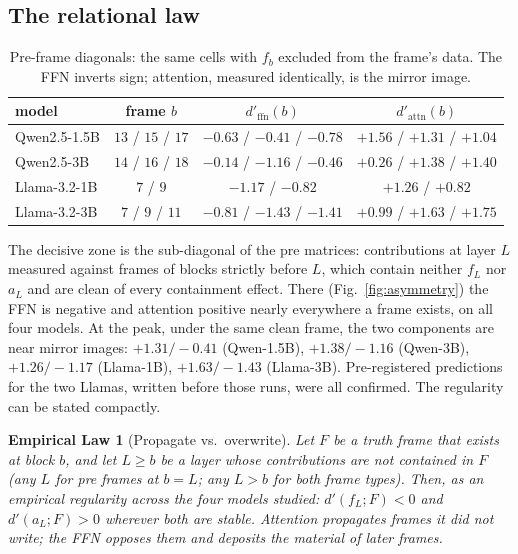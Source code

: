 \documentclass[11pt]{article}
\newtheorem{law}{Empirical Law}
\begin{document}
\subsection{The relational law}
\label{sec:law}

\begin{table}[H]
\centering
\caption{Pre-frame diagonals: the same cells with $f_b$ excluded from the
frame's data. The FFN inverts sign; attention, measured identically, is the
mirror image.}
\label{tab:pre}
\begin{tabular}{lccc}
\toprule
model & frame $b$ & $d'_{\mathrm{ffn}}(b)$ & $d'_{\mathrm{attn}}(b)$ \\
\midrule
Qwen2.5-1.5B & $13$ / $15$ / $17$ & $-0.63$ / $-0.41$ / $-0.78$ & $+1.56$ / $+1.31$ / $+1.04$ \\
Qwen2.5-3B   & $14$ / $16$ / $18$ & $-0.14$ / $-1.16$ / $-0.46$ & $+0.26$ / $+1.38$ / $+1.40$ \\
Llama-3.2-1B & $7$ / $9$          & $-1.17$ / $-0.82$           & $+1.26$ / $+0.82$ \\
Llama-3.2-3B & $7$ / $9$ / $11$   & $-0.81$ / $-1.43$ / $-1.41$ & $+0.99$ / $+1.63$ / $+1.75$ \\
\bottomrule
\end{tabular}
\end{table}

The decisive zone is the sub-diagonal of the pre matrices: contributions at
layer $L$ measured against frames of blocks strictly before $L$, which
contain neither $f_L$ nor $a_L$ and are clean of every containment effect.
There (Fig.~\ref{fig:asymmetry}) the FFN is negative and attention positive
nearly everywhere a frame exists, on all four models. At the peak, under
the same clean frame, the two components are near mirror images:
$+1.31/-0.41$ (Qwen-1.5B), $+1.38/-1.16$ (Qwen-3B), $+1.26/-1.17$
(Llama-1B), $+1.63/-1.43$ (Llama-3B). Pre-registered predictions for the
two Llamas, written before those runs, were all confirmed. The regularity
can be stated compactly.

\begin{law}[Propagate vs.\ overwrite]
\label{law:relational}
Let $F$ be a truth frame that exists at block $b$, and let $L \geq b$ be a
layer whose contributions are not contained in $F$ (any $L$ for pre frames
at $b = L$; any $L > b$ for both frame types). Then, as an empirical
regularity across the four models studied: $d'(f_L; F) < 0$ and
$d'(a_L; F) > 0$ wherever both are stable. Attention propagates frames it
did not write; the FFN opposes them and deposits the material of later
frames.
\end{law}
\end{document}
